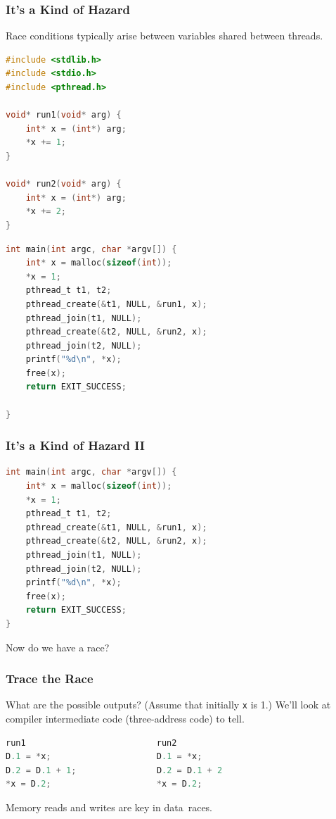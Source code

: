 \begin{frame}[fragile]
\frametitle{It's a Kind of Hazard}
Race conditions typically arise between variables shared
between threads.

\begin{minipage}[l]{0.39\linewidth}
\begin{lstlisting}[language=C]
#include <stdlib.h>
#include <stdio.h>
#include <pthread.h>

void* run1(void* arg) {
    int* x = (int*) arg;
    *x += 1;
}

void* run2(void* arg) {
    int* x = (int*) arg;
    *x += 2;
}
\end{lstlisting}
\end{minipage}
\begin{minipage}[r]{0.6\linewidth}
\begin{lstlisting}[language=C]
int main(int argc, char *argv[]) {
    int* x = malloc(sizeof(int));
    *x = 1;
    pthread_t t1, t2;
    pthread_create(&t1, NULL, &run1, x);
    pthread_join(t1, NULL);
    pthread_create(&t2, NULL, &run2, x);
    pthread_join(t2, NULL);
    printf("%d\n", *x);
    free(x);
    return EXIT_SUCCESS;

}
\end{lstlisting}
\end{minipage}

\end{frame}



\begin{frame}[fragile]
\frametitle{It's a Kind of Hazard II}

{\scriptsize
\begin{lstlisting}[language=C]
int main(int argc, char *argv[]) {
    int* x = malloc(sizeof(int));
    *x = 1;
    pthread_t t1, t2;
    pthread_create(&t1, NULL, &run1, x);
    pthread_create(&t2, NULL, &run2, x);
    pthread_join(t1, NULL);
    pthread_join(t2, NULL);
    printf("%d\n", *x);
    free(x);
    return EXIT_SUCCESS;
}
\end{lstlisting}
}

Now do we have a race?

\end{frame}



\begin{frame}[fragile]
\frametitle{Trace the Race}

What are the possible outputs? (Assume that initially {\tt *x} is 1.)
We'll look at compiler intermediate code (three-address code) to tell.

\begin{lstlisting}[language=C]
run1                          run2   
D.1 = *x;                     D.1 = *x;
D.2 = D.1 + 1;                D.2 = D.1 + 2
*x = D.2;                     *x = D.2;
  \end{lstlisting}


Memory reads and writes are key in data~races.

\end{frame}



